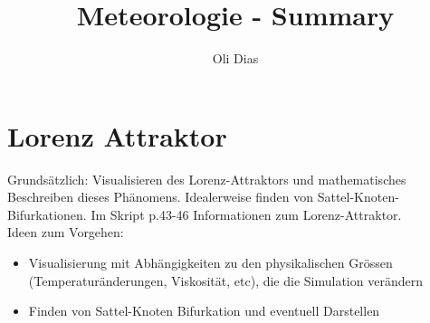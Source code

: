 \documentclass[12pt,a4paper]{article}
\author{Oli Dias}
\title{Meteorologie - Summary}
\begin{document}
\maketitle
\newpage
\section{Lorenz Attraktor}
Grundsätzlich: Visualisieren des Lorenz-Attraktors und mathematisches Beschreiben dieses Phänomens. Idealerweise finden von Sattel-Knoten-Bifurkationen. Im Skript p.43-46 Informationen zum Lorenz-Attraktor.\\

Ideen zum Vorgehen:
\begin{itemize}
	\item Visualisierung mit Abhängigkeiten zu den physikalischen Grössen (Temperaturänderungen, Viskosität, etc), die die Simulation verändern
	\item Finden von Sattel-Knoten Bifurkation und eventuell Darstellen
\end{itemize}
\end{document}
